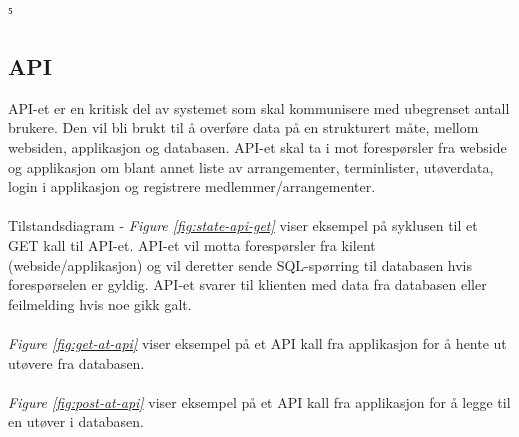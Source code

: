 ⁵\documentclass[norsk]{article}
\begin{document}
\subsection{API}
API-et er en kritisk del av systemet som skal kommunisere med ubegrenset antall brukere. Den vil bli brukt til å overføre data på en strukturert måte, mellom websiden, applikasjon og databasen. API-et skal ta i mot forespørsler fra webside og applikasjon om blant annet liste av arrangementer, terminlister, utøverdata, login i applikasjon og registrere medlemmer/arrangementer.\\ \\
Tilstandsdiagram - \textit{Figure \ref{fig:state-api-get}} viser eksempel på syklusen til et GET kall til API-et. API-et vil motta forespørsler fra kilent (webside/applikasjon) og vil deretter sende SQL-spørring til databasen hvis forespørselen er gyldig. API-et svarer til klienten med data fra databasen eller feilmelding hvis noe gikk galt. \\ \\
\textit{Figure \ref{fig:get-at-api}} viser eksempel på et API kall fra applikasjon for å hente ut utøvere fra databasen.\\ \\
\textit{Figure \ref{fig:post-at-api}} viser eksempel på et API kall fra applikasjon for å legge til en utøver i databasen.\\
\end{document}
